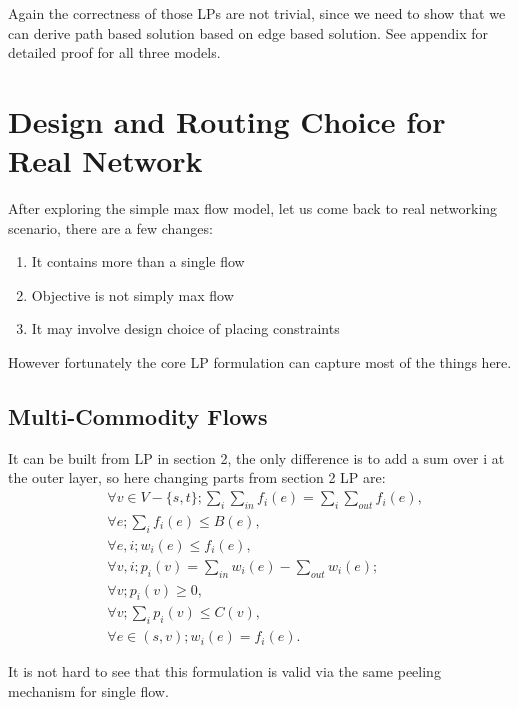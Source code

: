 \documentclass[twoside,leqno, 11pt]{article}
\begin{document}
Again the correctness of those LPs are not trivial, since we need to show that we can derive path based solution based on edge based solution. See appendix for detailed proof for all three models. 

\section{Design and Routing Choice for Real Network}
After exploring the simple max flow model, let us come back to real networking scenario, there are a few changes:
\begin{enumerate}
\item {It contains more than a single flow}
\item {Objective is not simply max flow}
\item {It may involve design choice of placing constraints}
\end{enumerate}

However fortunately the core LP formulation can capture most of the things here.
\subsection{Multi-Commodity Flows} It can be built from LP in section 2, the only difference is to add a sum over i at the outer layer, so here changing parts from section 2 LP are: \newline
\begin{subequations}
\begin{align*}
&\forall v \in V-\{s, t\}; \sum\limits_i \sum\limits_{in}  f_i(e)= \sum\limits_i  \sum\limits_{out} f_i(e),\\
&\forall e;\sum\limits_i  f_i(e)\leq B(e),\\
&\forall e, i; w_i(e) \leq f_i(e),\\
&\forall v, i; p_i(v) =  \sum\limits_{in } w_i(e) -  \sum\limits_{out} w_i(e) ;\\
&\forall v; p_i(v)\geq 0 ,\\
&\forall v; \sum\limits_i p_i(v)\leq C(v),\\
&\forall e\in(s, v) ; w_i(e) =f_i(e).
\end{align*}
\end{subequations}

It is not hard to see that this formulation is valid via the same peeling mechanism for single flow. 
\end{document}
